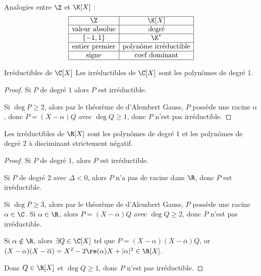 \begin{remarque}
    Analogies entre $\Z$ et $\K[X]$ :
    $$\begin{array}{|c|c|}
        \hline
        \Z & \K[X] \\
        \hline
        \text{valeur absolue} & \text{degré} \\
        \hline 
        \{-1, 1\} & \K^* \\
        \hline
        \text{entier premier} & \text{polynôme irréductible} \\
        \hline
        \text{signe} & \text{coef dominant} \\
        \hline
    \end{array}$$
\end{remarque}

\begin{theoreme}{Irréductibles de $\C[X]$}{}
    Les irréductibles de $\C[X]$ sont les polynômes de degré $1$.
\end{theoreme}

\begin{proof}
    Si $P$ de degré $1$ alors $P$ est irréductible.

    Si $\deg P \geqslant 2$, alors par le théorème de d'Alembert Gauss, 
    $P$ possède une racine $\alpha$, donc $P = (X - \alpha) Q$ avec $\deg Q \geqslant 1$, donc
    $P$ n'est pas irréductible.
\end{proof}

\begin{theoreme}{}{}
    Les irréductibles de $\R[X]$ sont les polynômes de degré $1$ et les polynômes
    de degré $2$ à disciminant strictement négatif.
\end{theoreme}

\begin{proof}
    Si $P$ de degré $1$, alors $P$ est irréductible.

    \avspace Si $P$ de degré $2$ avec $\Delta < 0$, alors $P$ n'a pas de racine dans $\R$, donc 
    $P$ est irréductible.

    \avspace Si $\deg P \geqslant 3$, alors par le théorème de d'Alembert Gauss, 
    $P$ possède une racine $\alpha \in \C$. Si $\alpha \in \R$, alors $P = (X - \alpha) Q$ avec $\deg Q \geqslant 2$, donc
    $P$ n'est pas irréductible.

    Si $\alpha \notin \R$, alors $\exists Q \in \C[X]$ tel que $P = (X - \alpha)(X - \overline \alpha) Q$, 
    or $(X - \alpha)(X - \overline \alpha) = X^2 - 2 \re(\alpha) X + |\alpha|^2 \in \R[X]$.

    Donc $Q \in \R[X]$ et $\deg Q \geqslant 1$, donc $P$ n'est pas irréductible.
\end{proof}


